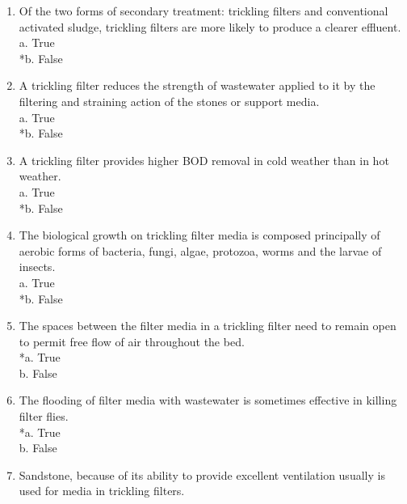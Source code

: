 \begin{enumerate}
\item  Of the two forms of secondary treatment: trickling filters and conventional activated sludge, trickling filters are more likely to produce a clearer effluent. \\

a. True \\
*b. False \\


\item  A trickling filter reduces the strength of wastewater applied to it by the filtering and straining action of the stones or support media. \\

a. True \\
*b. False \\


\item  A trickling filter provides higher BOD removal in cold weather than in hot weather. \\

a. True \\
*b. False \\


\item  The biological growth on trickling filter media is composed principally of aerobic forms of bacteria, fungi, algae, protozoa, worms and the larvae of insects. \\

a. True \\
*b. False \\


\item  The spaces between the filter media in a trickling filter need to remain open to permit free flow of air throughout the bed. \\

*a. True \\
b. False \\


\item  The flooding of filter media with wastewater is sometimes effective in killing filter flies. \\

*a. True \\
b. False \\


\item  Sandstone, because of its ability to provide excellent ventilation usually is used for media in trickling filters. \\


\end{enumerate}
